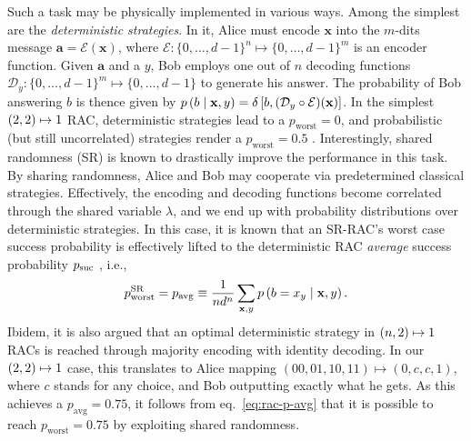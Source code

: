 			Such a task may be physically implemented in various ways. Among the simplest are the \emph{deterministic strategies}. In it, Alice must encode $\mathbf{x}$ into the $m$-dits message $\mathbf{a} = \mathcal{E}(\mathbf{x})$, where $\mathcal{E} : \{0, \ldots, d - 1\}^n \mapsto \{0, \ldots, d - 1\}^m$ is an encoder function. Given $\mathbf{a}$ and a $y$, Bob employs one out of $n$ decoding functions $\mathcal{D}_y : \{0, \ldots, d - 1\}^m \mapsto \{0, \ldots, d - 1\}$ to generate his answer. The probability of Bob answering $b$ is thence given by $p \left( b \mid \mathbf{x}, y \right) = \delta\left[b, (\mathcal{D}_{y} \circ \mathcal{E})(\mathbf{x})\right]$. In the simplest $\left( 2, 2 \right) \mapsto 1$ RAC, deterministic strategies lead to a $p_{\text{worst}} = 0$, and probabilistic (but still uncorrelated) strategies render a $p_{\text{worst}} = 0.5$ \cite{ambainis_qracsoriginal_1999,ambainis_srqracs_2009}. Interestingly, shared randomness (SR) is known to drastically improve the performance in this task. By sharing randomness, Alice and Bob may cooperate via predetermined classical strategies. Effectively, the encoding and decoding functions become correlated through the shared variable $\lambda$, and we end up with probability distributions over deterministic strategies. In this case, it is known that an SR-RAC's worst case success probability is effectively lifted to the deterministic RAC \emph{average} success probability $p_{\text{suc}}$ \cite{ambainis_srqracs_2009}, i.e., 
            \begin{equation}
                p_{\text{worst}}^{\text{SR}} = p_{\text{avg}} \equiv \frac{1}{nd^n} \sum_{\mathbf{x},y} p \left( b=x_y \mid \mathbf{x},y \right) .
                \label{eq:rac-p-avg}
            \end{equation}
			Ibidem, it is also argued that an optimal deterministic strategy in $\left( n, 2 \right) \mapsto 1$ RACs is reached through majority encoding with identity decoding. In our $\left( 2, 2 \right) \mapsto 1$ case, this translates to Alice mapping $(00, 01, 10, 11) \mapsto (0, c, c, 1)$, where $c$ stands for any choice, and Bob outputting exactly what he gets. As this achieves a $p_{\text{avg}} = 0.75$, it follows from eq.~\ref{eq:rac-p-avg} that it is possible to reach $p_{\text{worst}} = 0.75$ by exploiting shared randomness.
			

